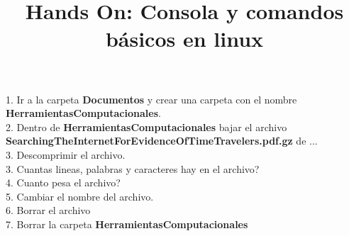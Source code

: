 \documentclass{article}
\title{Hands On: Consola y comandos b\'asicos en linux}
\begin{document}
\maketitle

1. Ir a la carpeta \textbf{Documentos} y crear una carpeta con el nombre \textbf{HerramientasComputacionales}.\\
2. Dentro de \textbf{HerramientasComputacionales} bajar el archivo\\ \textbf{SearchingTheInternetForEvidenceOfTimeTravelers.pdf.gz} de ...\\
3. Descomprimir el archivo.\\
3. Cuantas lineas, palabras y caracteres hay en el archivo?\\
4. Cuanto pesa el archivo?	\\
5. Cambiar el nombre del archivo.\\
6. Borrar el archivo\\
7. Borrar la carpeta \textbf{HerramientasComputacionales}
\end{document}
